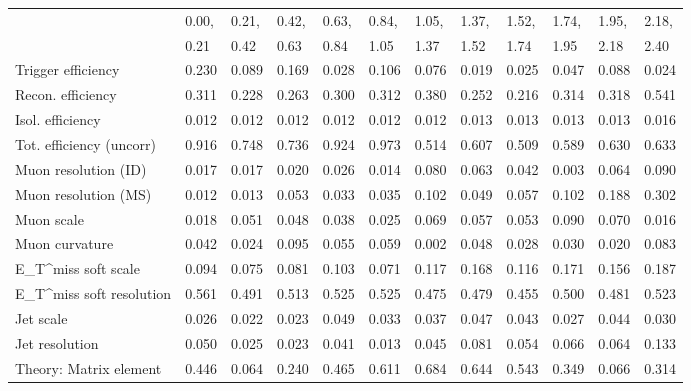 \begin{tabular}{l|p{0.6cm}p{0.6cm}p{0.6cm}p{0.6cm}p{0.6cm}p{0.6cm}p{0.6cm}p{0.6cm}p{0.6cm}p{0.6cm}p{0.6cm}}
\hline
   & 0.00, & 0.21, & 0.42, & 0.63, & 0.84, & 1.05, & 1.37, & 1.52, & 1.74, & 1.95, & 2.18,  \\ 
   & 0.21 & 0.42 & 0.63 & 0.84 & 1.05 & 1.37 & 1.52 & 1.74 & 1.95 & 2.18 & 2.40  \\ 
\hline
Trigger efficiency                       & 0.230 & 0.089 & 0.169 & 0.028 & 0.106 & 0.076 & 0.019 & 0.025 & 0.047 & 0.088 & 0.024 \\
Recon. efficiency                        & 0.311 & 0.228 & 0.263 & 0.300 & 0.312 & 0.380 & 0.252 & 0.216 & 0.314 & 0.318 & 0.541 \\
Isol. efficiency                         & 0.012 & 0.012 & 0.012 & 0.012 & 0.012 & 0.012 & 0.013 & 0.013 & 0.013 & 0.013 & 0.016 \\
Tot. efficiency (uncorr)                 & 0.916 & 0.748 & 0.736 & 0.924 & 0.973 & 0.514 & 0.607 & 0.509 & 0.589 & 0.630 & 0.633 \\
Muon resolution (ID)                     & 0.017 & 0.017 & 0.020 & 0.026 & 0.014 & 0.080 & 0.063 & 0.042 & 0.003 & 0.064 & 0.090 \\
Muon resolution (MS)                     & 0.012 & 0.013 & 0.053 & 0.033 & 0.035 & 0.102 & 0.049 & 0.057 & 0.102 & 0.188 & 0.302 \\
Muon scale                               & 0.018 & 0.051 & 0.048 & 0.038 & 0.025 & 0.069 & 0.057 & 0.053 & 0.090 & 0.070 & 0.016 \\
Muon curvature                           & 0.042 & 0.024 & 0.095 & 0.055 & 0.059 & 0.002 & 0.048 & 0.028 & 0.030 & 0.020 & 0.083 \\
E_{T}^{miss} soft scale                  & 0.094 & 0.075 & 0.081 & 0.103 & 0.071 & 0.117 & 0.168 & 0.116 & 0.171 & 0.156 & 0.187 \\
E_{T}^{miss} soft resolution             & 0.561 & 0.491 & 0.513 & 0.525 & 0.525 & 0.475 & 0.479 & 0.455 & 0.500 & 0.481 & 0.523 \\
Jet scale                                & 0.026 & 0.022 & 0.023 & 0.049 & 0.033 & 0.037 & 0.047 & 0.043 & 0.027 & 0.044 & 0.030 \\
Jet resolution                           & 0.050 & 0.025 & 0.023 & 0.041 & 0.013 & 0.045 & 0.081 & 0.054 & 0.066 & 0.064 & 0.133 \\
Theory: Matrix element                   & 0.446 & 0.064 & 0.240 & 0.465 & 0.611 & 0.684 & 0.644 & 0.543 & 0.349 & 0.066 & 0.314 \\

\end{tabular}
